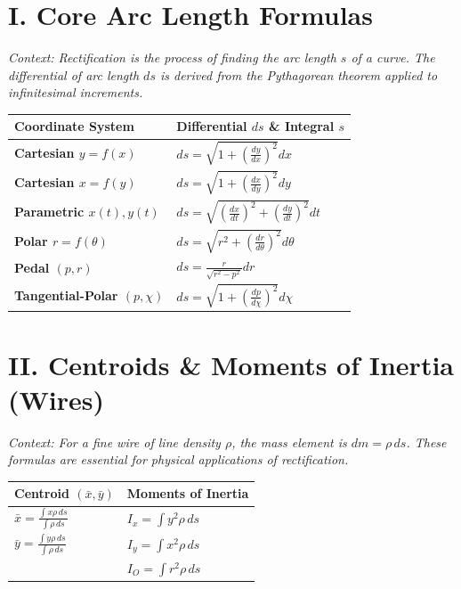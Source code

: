 \documentclass[11pt, a4paper]{article}
\begin{document}
\section*{\color{primary} I. Core Arc Length Formulas}

\textit{\small Context: Rectification is the process of finding the arc length $s$ of a curve. The differential of arc length $ds$ is derived from the Pythagorean theorem applied to infinitesimal increments.}

\begin{center}
\begin{tabular}{@{}p{} p{}@{}}
\toprule
\textbf{Coordinate System} & \textbf{Differential $ds$ \& Integral $s$} \\
\midrule
\textbf{Cartesian $y=f(x)$} & $ds = \sqrt{1 + \left(\frac{dy}{dx}\right)^2} dx$ \\
\textbf{Cartesian $x=f(y)$} & $ds = \sqrt{1 + \left(\frac{dx}{dy}\right)^2} dy$ \\
\textbf{Parametric $x(t), y(t)$} & $ds = \sqrt{\left(\frac{dx}{dt}\right)^2 + \left(\frac{dy}{dt}\right)^2} dt$ \\
\textbf{Polar $r=f(\theta)$} & $ds = \sqrt{r^2 + \left(\frac{dr}{d\theta}\right)^2} d\theta$ \\
\textbf{Pedal $(p, r)$} & $ds = \frac{r}{\sqrt{r^2-p^2}} dr$ \\
\textbf{Tangential-Polar $(p, \chi)$} & $ds = \sqrt{1 + \left(\frac{dp}{d\chi}\right)^2} d\chi$ \\
\bottomrule
\end{tabular}
\end{center}

\vspace{0.3cm}

\section*{\color{primary} II. Centroids \& Moments of Inertia (Wires)}

\textit{\small Context: For a fine wire of line density $\rho$, the mass element is $dm = \rho \, ds$. These formulas are essential for physical applications of rectification.}

\begin{center}
\begin{tabular}{@{}p{} p{}@{}}
\toprule
\textbf{Centroid $(\bar{x}, \bar{y})$} & \textbf{Moments of Inertia} \\
\midrule
$\bar{x} = \frac{\int x \rho \, ds}{\int \rho \, ds}$ & $I_x = \int y^2 \rho \, ds$ \\
$\bar{y} = \frac{\int y \rho \, ds}{\int \rho \, ds}$ & $I_y = \int x^2 \rho \, ds$ \\
& $I_O = \int r^2 \rho \, ds$ \\
\bottomrule
\end{tabular}
\end{center}
\end{document}
